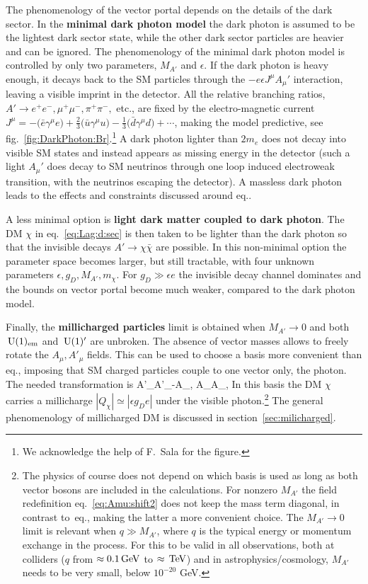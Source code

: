 \medskip

The phenomenology of the vector portal depends on the details of the dark sector. In the {\bf minimal dark photon model} the dark photon is assumed to be the lightest dark sector state, while the other dark sector particles are heavier and can be ignored. The phenomenology of the minimal dark photon model is controlled by only two parameters, $M_{A'}$ and $\epsilon$. 
If the dark photon is heavy enough, it decays back to the SM particles through the $- e \epsilon J^\mu A_\mu'$ interaction, leaving a visible imprint in the detector. 
All the relative branching ratios, $A'\to e^+e^-, \mu^+\mu^-, \pi^+\pi^-,$ etc., are fixed by the electro-magnetic current $J^\mu=- \big(\bar e \gamma^\mu e\big) +\tfrac{2}{3} \big(\bar u\gamma^\mu u\big)-\tfrac{1}{3} \big(\bar d\gamma^\mu d\big)+\cdots$, making the model predictive, see fig.~\ref{fig:DarkPhoton:Br}.\footnote{We acknowledge the help of F.~Sala for the figure.} 
A dark photon lighter than $2 m_e$ does not decay into visible SM states and instead appears as missing energy in the detector (such a light $A_\mu'$ does decay to SM neutrinos through one loop induced electroweak transition, with the neutrinos escaping the detector). 
A massless dark photon leads to the effects and constraints discussed around eq..


A less minimal option is {\bf light dark matter coupled to dark photon}. The DM $\chi$ in eq.~\eqref{eq:Lag:d:sec} is then taken to be lighter than the dark photon so that the invisible decays $A'\to \chi \bar\chi$ are possible. In this non-minimal option the parameter space becomes larger, but still tractable, 
with four unknown parameters $\epsilon, g_D, M_{A'}, m_\chi$. 
For $g_D\gg \epsilon e$ the invisible decay channel dominates and the bounds on vector portal become much weaker, compared to the dark photon model. 

\smallskip

Finally, the {\bf millicharged particles} limit is obtained when $M_{A'}\to 0$ and both $\,{\rm U}(1)_{\rm em}$ and $\,{\rm U}(1)'$ are unbroken. The absence of vector masses allows to freely rotate the $A_\mu , A'_\mu$ fields.
This can be used to choose a basis more convenient than eq.,
imposing that SM charged particles
couple to one vector only, the photon.
The needed transformation is 
\beq
\label{eq:Amu:shift2}
A'_\mu\to A'_\mu-\epsilon A_\mu, \qquad A_\mu\to A_\mu,
\eeq
In this basis the DM $\chi$ carries a millicharge $|Q_\chi|\simeq|\epsilon g_D e|$ under the visible photon.\footnote{The physics of course does not depend on which basis is used
as long as both vector bosons are included in the calculations.  
For nonzero $M_{A'}$ the field redefinition eq.~\eqref{eq:Amu:shift2} does not keep the mass term diagonal, in contrast to~eq., making the latter a more convenient choice. 
The $M_{A'}\to 0$ limit is relevant when $q\gg M_{A'}$, where $q$ is the typical energy or momentum exchange in the process. 
For this to be valid in all observations, both at colliders 
($q$ from $\approx 0.1\,{\rm GeV}$ to $\approx\,{\rm TeV}$) and in astrophysics/cosmology, $M_{A'}$ needs to be very small, below $10^{-20}$ GeV.}
The general phenomenology of millicharged DM is discussed in section~\ref{sec:milicharged}.
\smallskip

